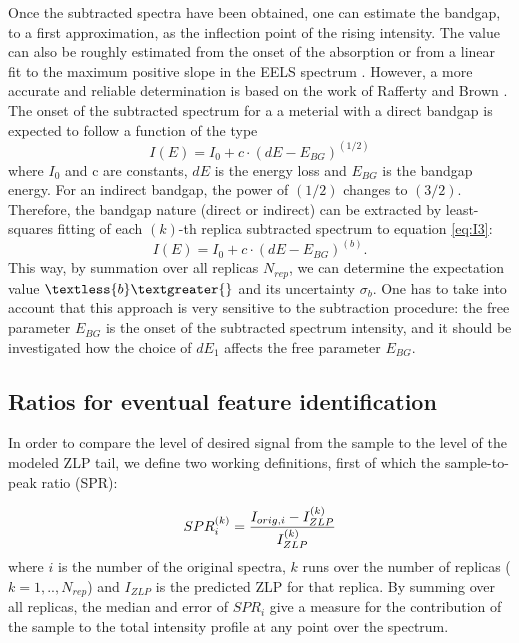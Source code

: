 \documentclass[11pt,a4paper]{article}
\def\frac#1#2{{{#1}\over {#2}}}
\numberwithin{equation}{section}
\numberwithin{figure}{section}
\numberwithin{table}{section}
\begin{document}
Once the subtracted spectra have been obtained, one can estimate the bandgap, to a first approximation, as the inflection point of the rising intensity. The value can also be roughly estimated from the onset of the absorption or from a linear fit to the maximum positive slope in the EELS spectrum \cite{Schamm:2003}. However, a more accurate and reliable determination is based on the work of Rafferty and Brown  \cite{Rafferty:2000}. The onset of the subtracted spectrum for a a meterial with a direct bandgap is expected to follow a function of the type
\begin{equation} \label{eq:I1}
    I(E) = I_0 + c\cdot(dE-E_{BG})^{(1/2)}
\end{equation}
where $I_0$ and c are constants, $dE$ is the energy loss and $E_{BG}$ is the bandgap energy. For an indirect bandgap, the power of $(1/2)$ changes to $(3/2)$. Therefore, the bandgap nature (direct or indirect) can be extracted by least-squares fitting of each $(k)$-th replica subtracted spectrum to equation \ref{eq:I3}:
\begin{equation} \label{eq:I3}
    I(E) = I_0 + c\cdot(dE-E_{BG})^{(b)}.
\end{equation}
This way, by summation over all replicas $N_{rep}$, we can determine the expectation value $\textless{b}\textgreater{}$ and its uncertainty $\sigma_b$. One has to take into account that this approach is very sensitive to the subtraction procedure: the free parameter $E_{BG}$ is the onset of the subtracted spectrum intensity, and it should be investigated how the choice of $dE_1$ affects the free parameter $E_{BG}$.

\subsection{Ratios for eventual feature identification}

In order to compare the level of desired signal from the sample to the level of the modeled ZLP tail, we define two working definitions, first of which the sample-to-peak ratio (SPR):

\begin{equation}
    SPR_{i}^{(k)} = \frac{I_{orig, i} - I_{ZLP}^{(k)}}{I_{ZLP}^{(k)}}
\end{equation}
where $i$ is the number of the original spectra, $k$ runs over the number of replicas ($k=1,..,N_{rep}$) and $I_{ZLP}$ is the predicted ZLP for that replica. By summing over all replicas, the median and error of $SPR_i$ give a measure for the contribution of the sample to the total intensity profile at any point over the spectrum. \\
\end{document}
